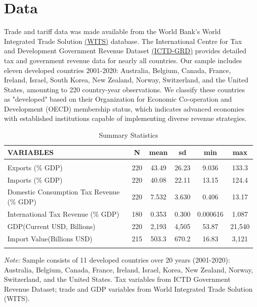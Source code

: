 \documentclass[12pt]{article}
\begin{document}
\section{Data}
\label{sec:data}

Trade and tariff data was made available from the World Bank's World Integrated Trade Solution \href{https://wits.worldbank.org/}{(WITS)} database. The International Centre for Tax and Development Government Revenue Dataset \href{https://www2.wider.unu.edu/content/grd-data-download}{(ICTD-GRD)} provides detailed tax and government revenue data for nearly all countries. Our sample includes eleven developed countries 2001-2020: Australia, Belgium, Canada, France, Ireland, Israel, South Korea, New Zealand, Norway, Switzerland, and the United States, amounting to 220 country-year observations. We classify these countries as "developed" based on their Organization for Economic Co-operation and Development (OECD) membership status, which indicates advanced economies with established institutions capable of implementing diverse revenue strategies. 

\begin{table}[htbp]
\centering
\begin{threeparttable}
\caption{Summary Statistics}
\label{tab:summary_stats}
\begin{tabular}{lccccc}
\hline
VARIABLES & N & mean & sd & min & max \\ \hline
 &  &  &  &  &  \\
Exports (\% GDP) & 220 & 43.49 & 26.23 & 9.036 & 133.3 \\
Imports (\% GDP) & 220 & 40.08 & 22.11 & 13.15 & 124.4 \\
Domestic Consumption Tax Revenue (\% GDP) & 220 & 7.532 & 3.630 & 0.406 & 13.17 \\
International Tax Revenue (\% GDP) & 180 & 0.353 & 0.300 & 0.000616 & 1.087 \\
GDP(Current USD, Billions) & 220 & 2,193 & 4,505 & 53.87 & 21,540 \\
Import Value(Billions USD) & 215 & 503.3 & 670.2 & 16.83 & 3,121 \\
 &  &  &  &  &  \\ \hline
\end{tabular}
\begin{tablenotes}[flushleft]
\small
\item \textit{Note:} Sample consists of 11 developed countries over 20 years (2001-2020): Australia, Belgium, Canada, France, Ireland, Israel, Korea, New Zealand, Norway, Switzerland, and the United States. Tax variables from ICTD Government Revenue Dataset; trade and GDP variables from World Integrated Trade Solution (WITS).
\end{tablenotes}
\end{threeparttable}
\end{table}
\end{document}
